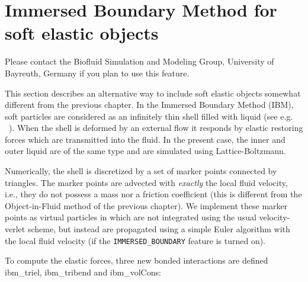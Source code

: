 %  
%   
%  
%  
%

\chapter{Immersed Boundary Method for soft elastic objects}
\label{sec:ibm}

\begin{citebox}
  Please contact the Biofluid Simulation and Modeling Group, University of Bayreuth, Germany if you plan to use this feature. 
\end{citebox}

This section describes an alternative way to include soft elastic objects somewhat different from the previous chapter. In the Immersed Boundary Method (IBM), soft particles are considered as an infinitely thin shell filled with liquid (see e.g. ~\cite{Peskin2002, Crowl2010, KruegerThesis}). When the shell is deformed by an external flow it responds by elastic restoring forces which are transmitted into the fluid. In the present case, the inner and outer liquid are of the same type and are simulated using Lattice-Boltzmann. 

Numerically, the shell is discretized by a set of marker points connected by triangles. The marker points are advected with \emph{exactly} the local fluid velocity, i.e., they do not possess a mass nor a friction coefficient (this is different from the Object-in-Fluid method of the previous chapter). We implement these marker points as virtual particles in \es which are not integrated using the usual velocity-verlet scheme, but instead are propagated using a simple Euler algorithm with the local fluid velocity (if the \texttt{IMMERSED_BOUNDARY} feature is turned on).

To compute the elastic forces, three new bonded interactions are defined ibm\_triel, ibm\_tribend and ibm\_volCons:

